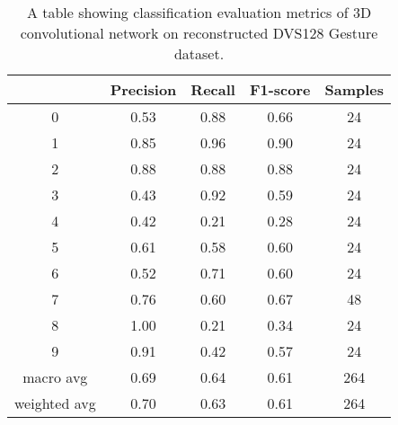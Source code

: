 \begin{table}[htb]
    \centering
    \begin{tabular}{|| c | c | c | c | c ||}
        \hline
            & Precision & Recall & F1-score & Samples \\
        \hline \hline
        0            & 0.53 & 0.88 & 0.66 & 24  \\
        \hline
        1            & 0.85 & 0.96 & 0.90 & 24  \\
        \hline
        2            & 0.88 & 0.88 & 0.88 & 24  \\
        \hline
        3            & 0.43 & 0.92 & 0.59 & 24  \\
        \hline
        4            & 0.42 & 0.21 & 0.28 & 24  \\
        \hline
        5            & 0.61 & 0.58 & 0.60 & 24  \\
        \hline
        6            & 0.52 & 0.71 & 0.60 & 24  \\
        \hline
        7            & 0.76 & 0.60 & 0.67 & 48  \\
        \hline
        8            & 1.00 & 0.21 & 0.34 & 24  \\
        \hline
        9            & 0.91 & 0.42 & 0.57 & 24  \\
        \hline
        macro avg    & 0.69 & 0.64 & 0.61 & 264 \\
        \hline
        weighted avg & 0.70 & 0.63 & 0.61 & 264 \\
        \hline
    \end{tabular}
    \caption{A table showing classification evaluation metrics of 3D convolutional network on reconstructed DVS128 Gesture dataset.}
    \label{tab:conv3d_dvs128_recon_evaluation_metrics}
\end{table}

